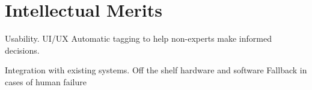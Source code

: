\section{Intellectual Merits}

Usability.
UI/UX
Automatic tagging to help non-experts make informed decisions.

Integration with existing systems.
Off the shelf hardware and software
Fallback in cases of human failure

